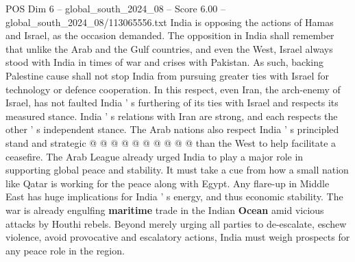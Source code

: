 \begin{textsample}{POS Dim 6 – global\_south\_2024\_08 – Score 6.00 – global\_south\_2024\_08/113065556.txt}
India is opposing the actions of Hamas and Israel, as the occasion demanded.
The opposition in India shall remember that unlike the Arab and the Gulf countries, and even the West, Israel always stood with India in times of war and crises with Pakistan.
As such, backing Palestine cause shall not stop India from pursuing greater ties with Israel for technology or defence cooperation.
In this respect, even Iran, the arch-enemy of Israel, has not faulted India ' s furthering of its ties with Israel and respects its measured stance.
India ' s relations with Iran are strong, and each respects the other ' s independent stance.
The Arab nations also respect India ' s principled stand and strategic @ @ @ @ @ @ @ @ @ @ than the West to help facilitate a ceasefire.
The Arab League already urged India to play a major role in supporting global peace and stability.
It must take a cue from how a small nation like Qatar is working for the peace along with Egypt.
Any flare-up in Middle East has huge implications for India ' s energy, and thus economic stability.
The war is already engulfing \textbf{maritime} trade in the Indian \textbf{Ocean} amid vicious attacks by Houthi rebels.
Beyond merely urging all parties to de-escalate, eschew violence, avoid provocative and escalatory actions, India must weigh prospects for any peace role in the region.

\end{textsample}
